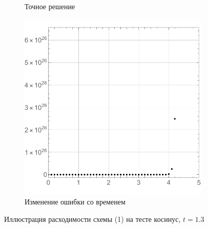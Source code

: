 \documentclass[12pt, a4paper]{article}
\begin{document}
\begin{figure}[!hp]
\begin{subfigure}[t]{0.32\textwidth}
		\caption{Точное решение}
		\label{test2}
	\end{subfigure}
	\hfill
	\begin{subfigure}[t]{0.32\textwidth}
		\centering
		\includegraphics[width=\textwidth]{res2_3}
		\caption{Изменение ошибки со временем}
		\label{test3}
	\end{subfigure}
	\caption{Иллюстрация расходимости схемы (1) на тесте косинус, $t = 1.3$}
\end{figure}
\end{document}
